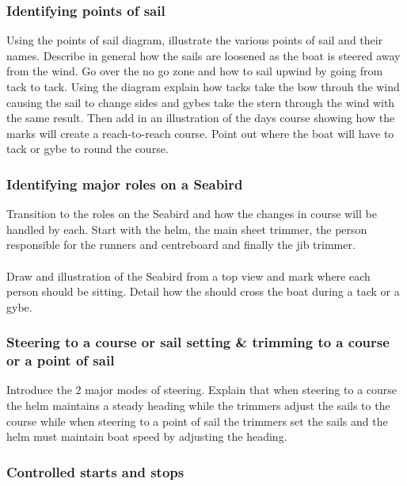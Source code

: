 \documentclass[12pt]{scrartcl}
\begin{document}
\subsubsection{Identifying points of sail} \label{subsubsec:points-of-sail}

Using the points of sail diagram, illustrate the various points of sail and their names. Describe in general how the sails are loosened as the boat is steered away from the wind. Go over the no go zone and how to sail upwind by going from tack to tack. Using the diagram explain how tacks take the bow throuh the wind causing the sail to change sides and gybes take the stern through the wind with the same result. Then add in an illustration of the days course showing how the marks will create a reach-to-reach course. Point out where the boat will have to tack or gybe to round the course.

\subsubsection{Identifying major roles on a Seabird} \label{subsubsec:major-roles}

Transition to the roles on the Seabird and how the changes in course will be handled by each. Start with the helm, the main sheet trimmer, the person responsible for the runners and centreboard and finally the jib trimmer.
\\
\\
Draw and illustration of the Seabird from a top view and mark where each person should be sitting. Detail how the should cross the boat during a tack or a gybe.

\subsubsection{Steering to a course or sail setting \& trimming to a course or a point of sail} \label{subsubsec:steering-trimming}

Introduce the 2 major modes of steering. Explain that when steering to a course the helm maintains a steady heading while the trimmers adjust the sails to the course while when steering to a point of sail the trimmers set the sails and the helm must maintain boat speed by adjusting the heading.

\subsubsection{Controlled starts and stops} \label{subsubsec:starts-stops}
\end{document}

